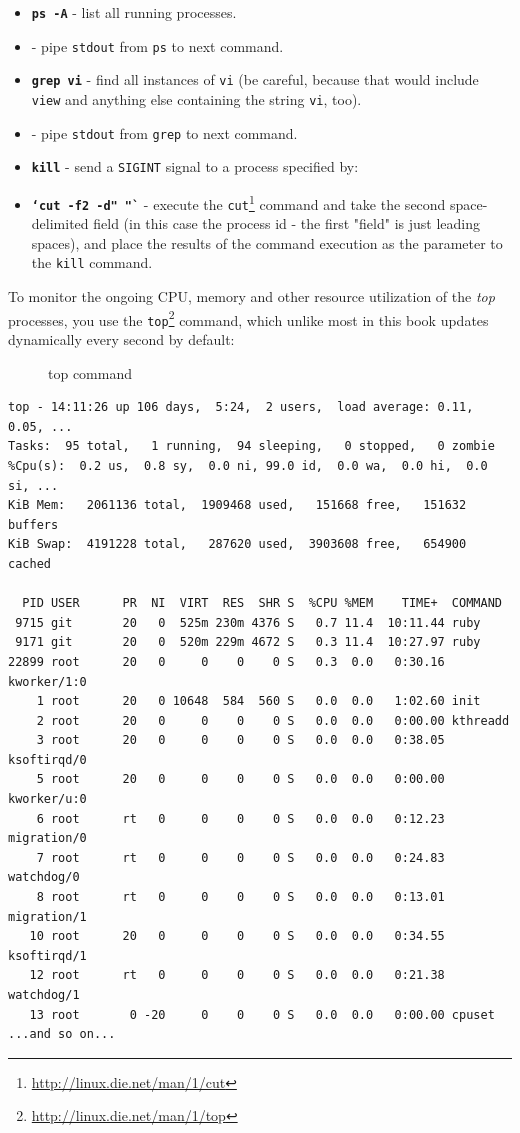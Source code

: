 \documentclass[10pt,]{book}
\renewcommand{\href}[2]{#2\footnote{\url{#1}}}
\numberwithin{figure}{chapter}
\DeclareRobustCommand{\drcap}[1]{\begin{figure}[H]\caption{#1}\end{figure}}
\DeclareRobustCommand{\drcmd}[1]{\index{Commands!#1}}
\begin{document}
\begin{itemize}
\item
  \textbf{\texttt{ps -A}} - list all running processes.
\item
  \textbf{\texttt{\textbar{}}} - pipe \texttt{stdout} from
  \texttt{ps} to next command.
\item
  \textbf{\texttt{grep vi}} - find all instances of \texttt{vi} (be
  careful, because that would include \texttt{view} and anything else
  containing the string \texttt{vi}, too).
\item
  \textbf{\texttt{\textbar{}}} - pipe \texttt{stdout} from
  \texttt{grep}\drcmd{grep} to next command.
\item
  \textbf{\texttt{kill}} - send a \texttt{SIGINT} signal
  to a process specified by:
\item
  \textbf{\texttt{`cut -f2 -d" "`}} - execute the
  \href{http://linux.die.net/man/1/cut}{\texttt{cut}}\drcmd{cut} command
  and take the second space-delimited field (in this case the process id
  - the first "field" is just leading spaces), and place the results of
  the command execution as the parameter to the \texttt{kill} command.
\end{itemize}

To monitor the ongoing CPU, memory and other resource utilization of the
\emph{top} processes, you use the
\href{http://linux.die.net/man/1/top}{\texttt{top}}\drcmd{top} command,
which unlike most in this book updates dynamically every second by
default:

\drcap{top command}

\begin{verbatim}
top - 14:11:26 up 106 days,  5:24,  2 users,  load average: 0.11, 0.05, ...
Tasks:  95 total,   1 running,  94 sleeping,   0 stopped,   0 zombie
%Cpu(s):  0.2 us,  0.8 sy,  0.0 ni, 99.0 id,  0.0 wa,  0.0 hi,  0.0 si, ...
KiB Mem:   2061136 total,  1909468 used,   151668 free,   151632 buffers
KiB Swap:  4191228 total,   287620 used,  3903608 free,   654900 cached

  PID USER      PR  NI  VIRT  RES  SHR S  %CPU %MEM    TIME+  COMMAND
 9715 git       20   0  525m 230m 4376 S   0.7 11.4  10:11.44 ruby
 9171 git       20   0  520m 229m 4672 S   0.3 11.4  10:27.97 ruby
22899 root      20   0     0    0    0 S   0.3  0.0   0:30.16 kworker/1:0
    1 root      20   0 10648  584  560 S   0.0  0.0   1:02.60 init
    2 root      20   0     0    0    0 S   0.0  0.0   0:00.00 kthreadd
    3 root      20   0     0    0    0 S   0.0  0.0   0:38.05 ksoftirqd/0
    5 root      20   0     0    0    0 S   0.0  0.0   0:00.00 kworker/u:0
    6 root      rt   0     0    0    0 S   0.0  0.0   0:12.23 migration/0
    7 root      rt   0     0    0    0 S   0.0  0.0   0:24.83 watchdog/0
    8 root      rt   0     0    0    0 S   0.0  0.0   0:13.01 migration/1
   10 root      20   0     0    0    0 S   0.0  0.0   0:34.55 ksoftirqd/1
   12 root      rt   0     0    0    0 S   0.0  0.0   0:21.38 watchdog/1
   13 root       0 -20     0    0    0 S   0.0  0.0   0:00.00 cpuset
...and so on...
\end{verbatim}
\end{document}
